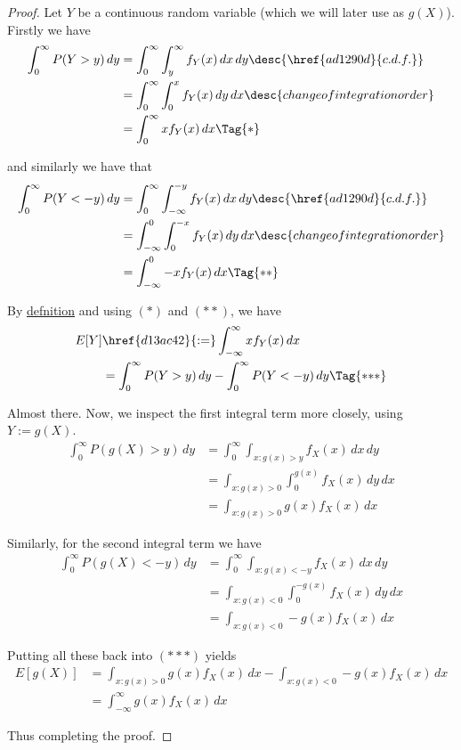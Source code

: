 \begin{proof}
  Let $Y$ be a continuous random variable (which we will later use as $g(X)$).
  Firstly we have
  \begin{align*}
    \int_0^\infty P(Y>y)\,dy
     &=\int_0^\infty\int_y^\infty f_Y(x)\,dx\,dy\desc{\href{ad1290d}{c.d.f.}} \\
     &=\int_0^\infty\int_0^xf_Y(x)\,dy\,dx\desc{change of integration order}  \\
     &=\int_0^\infty xf_Y(x)\,dx\Tag{*}
  \end{align*}

  and similarly we have that
  \begin{align*}
    \int_0^\infty P(Y<-y)\,dy
     &=\int_0^\infty\int_{-\infty}^{-y}f_Y(x)\,dx\,dy\desc{\href{ad1290d}{c.d.f.}} \\
     &=\int_{-\infty}^0\int_0^{-x}f_Y(x)\,dy\,dx\desc{change of integration order} \\
     &=\int_{-\infty}^0-xf_Y(x)\,dx\Tag{**}
  \end{align*}

  By \href{d13ac42}{defnition} and using $(*)$ and $(**)$, we have
  \begin{align*}
    E[Y] &\href{d13ac42}{:=}\int_{-\infty}^\infty xf_Y(x)\,dx            \\
         &=\int_0^\infty P(Y>y)\,dy-\int_0^\infty P(Y<-y)\,dy\Tag{*{*}*}
  \end{align*}

  Almost there. Now, we inspect the first integral term more closely, using
  $Y:=g(X)$.
  \begin{align*}
    \int_0^\infty P(g(X)>y)\,dy
     &=\int_0^\infty\int_{x:g(x)>y}f_X(x)\,dx\,dy \\
     &=\int_{x:g(x)>0}\int_0^{g(x)}f_X(x)\,dy\,dx \\
     &=\int_{x:g(x)>0}g(x)f_X(x)\,dx
  \end{align*}

  Similarly, for the second integral term we have
  \begin{align*}
    \int_0^\infty P(g(X)<-y)\,dy
     &=\int_0^\infty\int_{x:g(x)<-y}f_X(x)\,dx\,dy \\
     &=\int_{x:g(x)<0}\int_0^{-g(x)}f_X(x)\,dy\,dx \\
     &=\int_{x:g(x)<0}-g(x)f_X(x)\,dx
  \end{align*}

  Putting all these back into $(*{*}*)$ yields
  \begin{align*}
    E[g(X)] &=\int_{x:g(x)>0}g(x)f_X(x)\,dx-\int_{x:g(x)<0}-g(x)f_X(x)\,dx \\
            &=\int_{-\infty}^\infty g(x)f_X(x)\,dx
  \end{align*}

  Thus completing the proof.
\end{proof}

